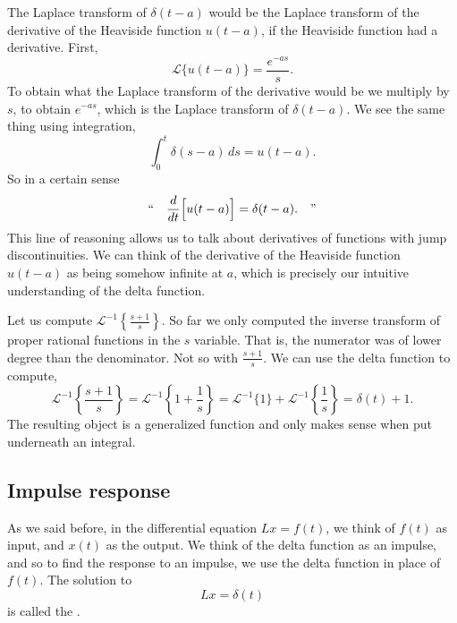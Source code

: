 \begin{remark}
The Laplace transform of $\delta(t-a)$ would be 
the Laplace transform of the derivative of the Heaviside function
$u(t-a)$, if the Heaviside function had a derivative.
First,
\begin{equation*}
{\mathcal{L}} \bigl\{ u(t-a) \bigr\} = \frac{e^{-as}}{s}.
\end{equation*}
To obtain what the Laplace transform of the derivative would be
we multiply by $s$, to obtain $e^{-as}$, which is the Laplace transform
of $\delta(t-a)$.
We see the same thing using integration,
\begin{equation*}
\int_0^t \delta(s-a)\,ds = u(t-a) .
\end{equation*}
So in a certain sense
\begin{equation*}
\text{``}
\quad \frac{d}{dt} \Bigl[ u(t-a) \Bigr] = \delta(t-a) . \quad
\text{''}
\end{equation*}
This line of reasoning allows us to talk about derivatives of functions with jump
discontinuities.
We can think of
the derivative of the Heaviside function $u(t-a)$ as being somehow infinite
at $a$, which is precisely our intuitive understanding of the delta
function.
\end{remark}

\begin{example}
Let us compute ${\mathcal{L}}^{-1} \left\{ \frac{s+1}{s} \right\}$.  So
far we only computed the inverse transform of proper rational functions
in the $s$ variable.
That is, the numerator was of lower degree than the denominator.
Not so with $\frac{s+1}{s}$.
We can use the delta function to compute,
\begin{equation*}
{\mathcal{L}}^{-1} \left\{ \frac{s+1}{s} \right\}
=
{\mathcal{L}}^{-1} \left\{ 1 + \frac{1}{s} \right\}
=
{\mathcal{L}}^{-1} \{ 1 \}
+
{\mathcal{L}}^{-1} \left\{ \frac{1}{s} \right\}
=
\delta(t) + 1 .
\end{equation*}
The resulting object is a generalized
function and only makes sense when put underneath an integral.
\end{example}

\subsection{Impulse response}

As we said before, in the differential equation
$L x = f(t)$,
we think of $f(t)$ as input, and $x(t)$ as the output.
We think of the delta function as an impulse, and so
to find the response to an impulse, we use
the delta function in place of $f(t)$.
The solution to
\begin{equation*}
L x = \delta(t)
\end{equation*}
is called the
\emph{}.

